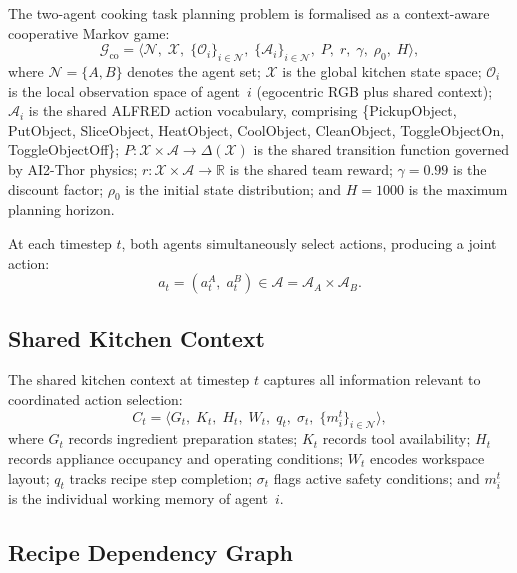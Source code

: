 \documentclass[pdflatex,sn-mathphys-num]{sn-jnl}
\theoremstyle{thmstyleone}
\theoremstyle{thmstyletwo}
\theoremstyle{thmstylethree}
\newcommand{\Ct}{C_{t}}
\newcommand{\RR}{\mathbb{R}}
\begin{document}
The two-agent cooking task planning problem is formalised as a
context-aware cooperative Markov game:
\begin{equation}\label{eq:game}
  \mathcal{G}_{\mathrm{co}}
  = \bigl\langle
    \mathcal{N},\;\mathcal{X},\;
    \{\mathcal{O}_i\}_{i\in\mathcal{N}},\;
    \{\mathcal{A}_i\}_{i\in\mathcal{N}},\;
    P,\;r,\;\gamma,\;\rho_0,\;H
    \bigr\rangle,
\end{equation}
where $\mathcal{N}=\{A,B\}$ denotes the agent set;
$\mathcal{X}$ is the global kitchen state space;
$\mathcal{O}_i$ is the local observation space of agent~$i$
(egocentric RGB plus shared context);
$\mathcal{A}_i$ is the shared ALFRED action vocabulary, comprising
\{PickupObject, PutObject, SliceObject, HeatObject, CoolObject,
CleanObject, ToggleObjectOn, ToggleObjectOff\};
$P:\mathcal{X}\times\mathcal{A}\rightarrow\Delta(\mathcal{X})$ is the
shared transition function governed by AI2-Thor physics;
$r:\mathcal{X}\times\mathcal{A}\rightarrow\RR$ is the shared team
reward; $\gamma=0.99$ is the discount factor;
$\rho_0$ is the initial state distribution;
and $H=1000$ is the maximum planning horizon.

At each timestep $t$, both agents simultaneously select actions,
producing a joint action:
\begin{equation}\label{eq:joint}
  a_t = (a_t^A,\;a_t^B)\in\mathcal{A}=\mathcal{A}_A\times\mathcal{A}_B.
\end{equation}

\subsection{Shared Kitchen Context}

The shared kitchen context at timestep $t$ captures all information
relevant to coordinated action selection:
\begin{equation}\label{eq:context}
  \Ct = \bigl\langle
    G_t,\;K_t,\;H_t,\;W_t,\;q_t,\;\sigma_t,\;
    \{m_i^t\}_{i\in\mathcal{N}}
    \bigr\rangle,
\end{equation}
where $G_t$ records ingredient preparation states;
$K_t$ records tool availability;
$H_t$ records appliance occupancy and operating conditions;
$W_t$ encodes workspace layout;
$q_t$ tracks recipe step completion;
$\sigma_t$ flags active safety conditions;
and $m_i^t$ is the individual working memory of agent~$i$.

\subsection{Recipe Dependency Graph}
\end{document}
